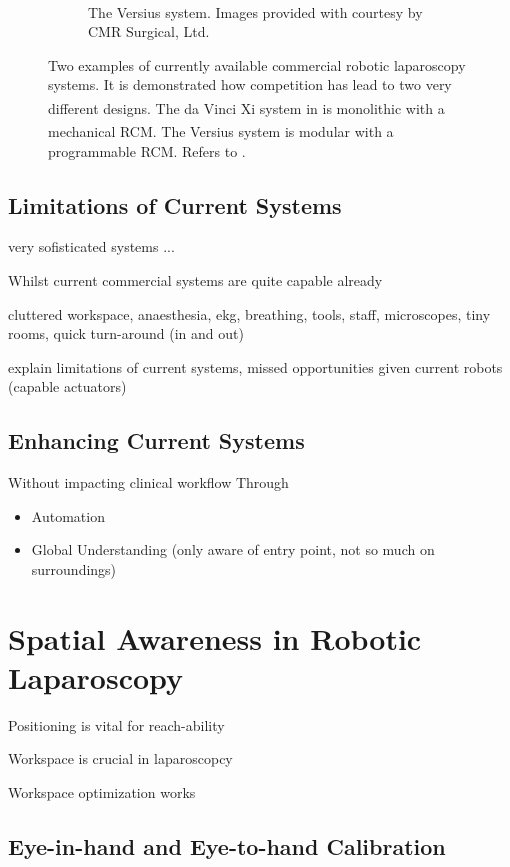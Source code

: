 \begin{figure}
\begin{subfigure}[b]{0.49\textwidth}
        \caption{The Versius\textsuperscript{\textregistered} system. Images provided with courtesy by  CMR Surgical, Ltd.}
        \label{in:fig:versius}
    \end{subfigure}
    \caption{Two examples of currently available commercial robotic laparoscopy systems. It is demonstrated how competition has lead to two very different designs. The da Vinci\textsuperscript{\textregistered} Xi system in  is monolithic with a mechanical RCM. The Versius\textsuperscript{\textregistered} system is modular with a programmable RCM. Refers to .}
    \label{in:fig:surgical_systems}
\end{figure}

\subsection{Limitations of Current Systems}
very sofisticated systems ...

Whilst current commercial systems are quite capable already 

cluttered workspace, anaesthesia, ekg, breathing, tools, staff, microscopes, tiny rooms, quick turn-around (in and out)

explain limitations of current systems, missed opportunities given current robots (capable actuators)

\subsection{Enhancing Current Systems}
Without impacting clinical workflow
Through
\begin{itemize}
    \item Automation
    \item Global Understanding (only aware of entry point, not so much on surroundings)
\end{itemize}

\section{Spatial Awareness in Robotic Laparoscopy}
Positioning is vital for reach-ability \cite{zelechowski2023automatic}

Workspace is crucial in laparoscopcy \cite{alhusseinawi2023validation}

Workspace optimization works \cite{hutzl2015knowledge}

\subsection{Eye-in-hand and Eye-to-hand Calibration}
